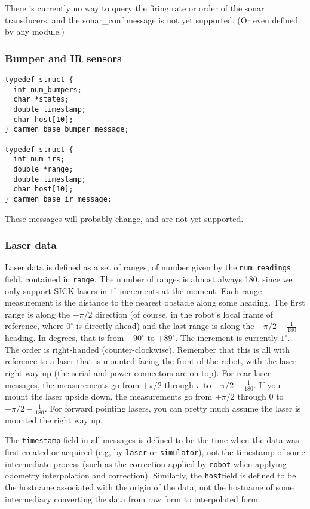 \documentclass{article}
\begin{document}
There is currently no way to query the firing rate or order of the sonar
transducers, and the sonar\_conf message is not yet supported. (Or even defined
by any module.)

\subsubsection{Bumper and IR sensors}

\begin{verbatim}
typedef struct {
  int num_bumpers;
  char *states;
  double timestamp;
  char host[10];
} carmen_base_bumper_message;

typedef struct {
  int num_irs;
  double *range;
  double timestamp;
  char host[10];
} carmen_base_ir_message;
\end{verbatim}

These messages will probably change, and are not yet supported.

\subsubsection{Laser data}

Laser data is defined as a set of ranges, of number given by the
\verb!num_readings! field, contained in \verb!range!. The number of ranges is
almost always 180, since we only support SICK lasers in $1^\circ$ increments
at the moment. Each range measurement is the distance to the nearest obstacle
along some heading. The first range is along the $-\pi/2$ direction (of
course, in the robot's local frame of reference, where $0^\circ$ is directly
ahead) and the last range is along the $+\pi/2-\frac{1}{180}$ heading. In
degrees, that is from $-90^\circ$ to $+89^\circ$. The increment is currently
$1^\circ$. The order is right-handed (counter-clockwise). Remember that this
is all with reference to a laser that is mounted facing the front of the
robot, with the laser right way up (the serial and power connectors are on
top). For rear laser messages, the measurements go from $+\pi/2$ through $\pi$
to $-\pi/2-\frac{1}{180}$. If you mount the laser upside down, the
measurements go from $+\pi/2$ through $0$ to $-\pi/2-\frac{1}{180}$. For
forward pointing lasers, you can pretty much assume the laser is mounted the
right way up.

The \verb!timestamp! field in all messages is defined to be the time when the
data was first created or acquired (e.g, by \verb!laser! or \verb!simulator!),
not the timestamp of some intermediate process (such as the correction applied
by \verb!robot! when applying odometry interpolation and correction).
Similarly, the \verb!host!field is defined to be the hostname associated with
the origin of the data, not the hostname of some intermediary converting the
data from raw form to interpolated form. 
\end{document}
